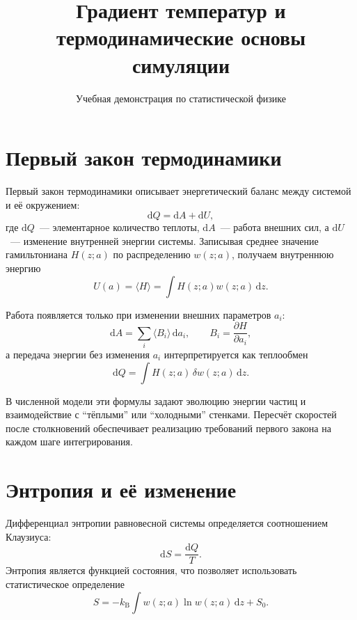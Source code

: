 \documentclass[12pt,a4paper]{article}
\title{Градиент температур и термодинамические основы симуляции}
\author{Учебная демонстрация по статистической физике}
\date{}
\begin{document}
\maketitle

\tableofcontents
\newpage

\section{Первый закон термодинамики}
Первый закон термодинамики описывает энергетический баланс между системой и её окружением:
\begin{equation}
    \mathrm{d}Q = \mathrm{d}A + \mathrm{d}U,
\end{equation}
где $\mathrm{d}Q$~--- элементарное количество теплоты, $\mathrm{d}A$~--- работа внешних сил, а $\mathrm{d}U$~--- изменение внутренней энергии системы. Записывая среднее значение гамильтониана $H(z; a)$ по распределению $w(z; a)$, получаем внутреннюю энергию
\begin{equation}
    U(a) = \langle H \rangle = \int H(z; a) w(z; a)\, \mathrm{d}z.
\end{equation}

Работа появляется только при изменении внешних параметров $a_i$:
\begin{equation}
    \mathrm{d}A = \sum_i \langle B_i \rangle\, \mathrm{d}a_i, \qquad B_i = \frac{\partial H}{\partial a_i},
\end{equation}
а передача энергии без изменения $a_i$ интерпретируется как теплообмен
\begin{equation}
    \mathrm{d}Q = \int H(z; a)\, \delta w(z; a)\, \mathrm{d}z.
\end{equation}

В численной модели эти формулы задают эволюцию энергии частиц и взаимодействие с ``тёплыми'' или ``холодными'' стенками. Пересчёт скоростей после столкновений обеспечивает реализацию требований первого закона на каждом шаге интегрирования.

\section{Энтропия и её изменение}
Дифференциал энтропии равновесной системы определяется соотношением Клаузиуса:
\begin{equation}
    \mathrm{d}S = \frac{\mathrm{d}Q}{T}.
\end{equation}
Энтропия является функцией состояния, что позволяет использовать статистическое определение
\begin{equation}
    S = -k_{\mathrm{B}} \int w(z; a) \ln w(z; a)\, \mathrm{d}z + S_0.
\end{equation}
\end{document}
